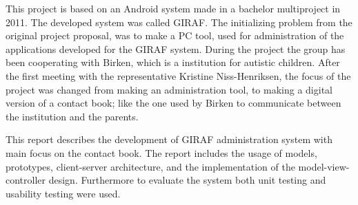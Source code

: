 This project is based on an Android system made in a bachelor multiproject in 2011. The developed system was called GIRAF. The initializing problem from the original project proposal, was to make a PC tool, used for administration of the applications developed for the GIRAF system. During the project the group has been cooperating with Birken, which is a institution for autistic children. After the first meeting with the representative Kristine Niss-Henriksen, the focus of the project was changed from making an administration tool, to making a digital version of a contact book; like the one used by Birken to communicate between the institution and the parents.

This report describes the development of GIRAF administration system with main focus on the contact book. The report includes the usage of models, prototypes, client-server architecture, and the implementation of the model-view-controller design. Furthermore to evaluate the system both unit testing and usability testing were used.